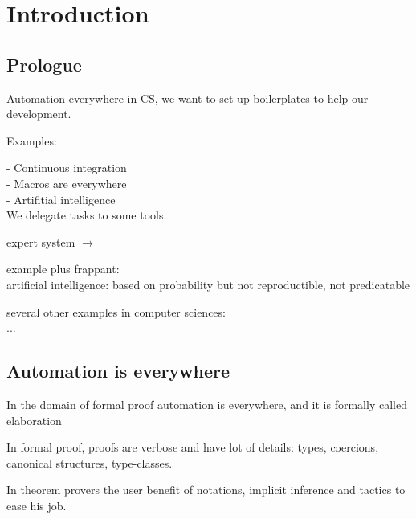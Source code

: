 \chapter{Introduction}

\section{Prologue}

Automation everywhere in CS, we want to set up boilerplates to help our
development.

Examples:

- Continuous integration\\
- Macros are everywhere\\
- Artifitial intelligence\\

We delegate tasks to some tools.

expert system $\to$ 

example plus frappant: \\
artificial intelligence: based on probability but not reproductible, not predicatable

several other examples in computer sciences:\\
...



\section{Automation is everywhere}

In the domain of formal proof automation is everywhere, and it is formally
called elaboration~\cite{elaboration}

In formal proof, proofs are verbose and have lot of details: types, coercions,
canonical structures, type-classes. 

In theorem provers the user benefit of notations, implicit inference and
tactics to ease his job.




